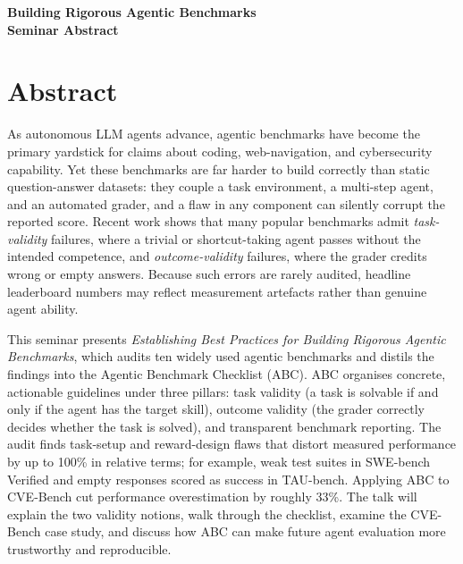 \documentclass[11pt]{article}
\begin{document}
\begin{center}
{\LARGE\bfseries Building Rigorous Agentic Benchmarks}\\[1.1em]
{\large\bfseries Seminar Abstract}\\[0.6em]
{\normalsize \seminarDate}
\end{center}
\vspace{0.6em}
\section*{Abstract}
As autonomous LLM agents advance, agentic benchmarks have become the primary yardstick for claims about coding, web-navigation, and cybersecurity capability. Yet these benchmarks are far harder to build correctly than static question-answer datasets: they couple a task environment, a multi-step agent, and an automated grader, and a flaw in any component can silently corrupt the reported score. Recent work shows that many popular benchmarks admit \emph{task-validity} failures, where a trivial or shortcut-taking agent passes without the intended competence, and \emph{outcome-validity} failures, where the grader credits wrong or empty answers. Because such errors are rarely audited, headline leaderboard numbers may reflect measurement artefacts rather than genuine agent ability.

This seminar presents \emph{Establishing Best Practices for Building Rigorous Agentic Benchmarks}, which audits ten widely used agentic benchmarks and distils the findings into the Agentic Benchmark Checklist (ABC). ABC organises concrete, actionable guidelines under three pillars: task validity (a task is solvable if and only if the agent has the target skill), outcome validity (the grader correctly decides whether the task is solved), and transparent benchmark reporting. The audit finds task-setup and reward-design flaws that distort measured performance by up to 100\% in relative terms; for example, weak test suites in SWE-bench Verified and empty responses scored as success in TAU-bench. Applying ABC to CVE-Bench cut performance overestimation by roughly 33\%. The talk will explain the two validity notions, walk through the checklist, examine the CVE-Bench case study, and discuss how ABC can make future agent evaluation more trustworthy and reproducible.
\end{document}
